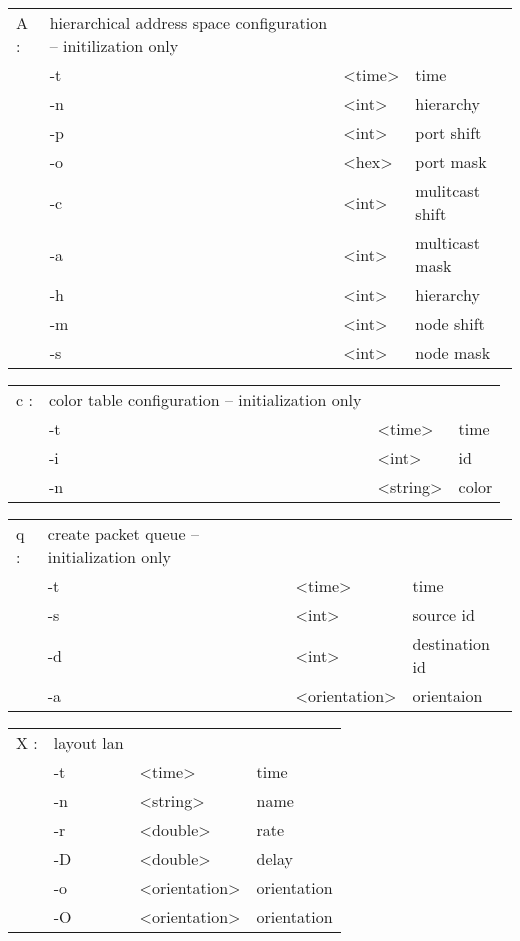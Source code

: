   \begin{tabular}{llll}
  A : & hierarchical address space configuration -- initilization only & & \\
    &  -t & <time> & time \\
    &  -n & <int> & hierarchy \\
    &  -p & <int> & port shift \\
    &  -o & <hex> & port mask \\
    &  -c & <int> & mulitcast shift \\
    &  -a & <int> & multicast mask \\
    &  -h & <int> & hierarchy \\
    &  -m & <int> & node shift \\
    &  -s & <int> & node mask \\
  \end{tabular}

  \begin{tabular}{llll}
  c : & color table configuration -- initialization only & & \\
    &  -t & <time> & time \\
    &  -i & <int> & id \\
    &  -n & <string> & color \\
  \end{tabular}

  \begin{tabular}{llll}
  q : & create packet queue -- initialization only & & \\
    &  -t & <time> & time \\
    &  -s & <int> & source id \\
    &  -d & <int> & destination id \\
    &  -a & <orientation> & orientaion \\
  \end{tabular}

  \begin{tabular}{llll}
  X : & layout lan & & \\
    &  -t & <time> & time \\
    &  -n & <string> & name \\
    &  -r & <double> & rate \\
    &  -D & <double> & delay \\
    &  -o & <orientation> & orientation \\
    &  -O & <orientation> & orientation \\
  \end{tabular}

